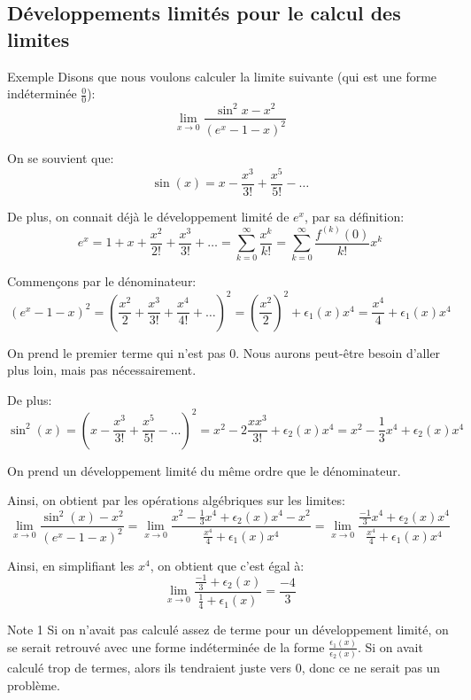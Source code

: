 \documentclass[a4paper]{article}
\begin{document}
\subsection{Développements limités pour le calcul des limites}
\begin{parag}{Exemple}
    Disons que nous voulons calculer la limite suivante (qui est une forme indéterminée $\frac{0}{0}$):
    \[\lim_{x \to 0} \frac{\sin^2 x - x^2}{\left(e^x  - 1 - x\right)^2}\]

    On se souvient que:
    \[\sin\left(x\right) = x - \frac{x^3}{3!} + \frac{x^5}{5!} - \ldots\]

    De plus, on connait déjà le développement limité de $e^x$, par sa définition:
    \[e^x = 1 + x + \frac{x^2}{2!} + \frac{x^3}{3!} + \ldots = \sum_{k=0}^{\infty} \frac{x^k}{k!} = \sum_{k=0}^{\infty} \frac{f^{\left(k\right)}\left(0\right)}{k!} x^k\]

    Commençons par le dénominateur:
    \[\left(e^x - 1 - x\right)^2 = \left(\frac{x^2}{2} + \frac{x^3}{3!} + \frac{x^4}{4!} + \ldots\right)^2 = \left(\frac{x^2}{2}\right)^2 + \epsilon_1\left(x\right) x^4 = \frac{x^4}{4} + \epsilon_1\left(x\right) x^4\]

    On prend le premier terme qui n'est pas 0. Nous aurons peut-être besoin d'aller plus loin, mais pas nécessairement.

    De plus:
    \[\sin^2\left(x\right) = \left(x - \frac{x^3}{3!} + \frac{x^5}{5!} - \ldots\right)^2 = x^2 - 2 \frac{x x^3}{3!} + \epsilon_2\left(x\right) x^4 = x^2 - \frac{1}{3}x^4 + \epsilon_2\left(x\right) x^4\]

    On prend un développement limité du même ordre que le dénominateur.

    Ainsi, on obtient par les opérations algébriques sur les limites:
    \[\lim_{x \to 0} \frac{\sin^2\left(x\right) - x^2}{\left(e^x - 1 - x\right)^2} = \lim_{x \to 0} \frac{x^2 - \frac{1}{3} x^4 + \epsilon_2\left(x\right) x^4 - x^{2}}{\frac{x^4}{4} + \epsilon_1\left(x\right) x^4} = \lim_{x \to 0} \frac{\frac{-1}{3}x^4 + \epsilon_2\left(x\right)x^4}{\frac{x^4}{4} + \epsilon_1\left(x\right)x^4}\]

    Ainsi, en simplifiant les $x^4$, on obtient que c'est égal à:
    \[\lim_{x \to 0} \frac{\frac{-1}{3} + \epsilon_2\left(x\right)}{\frac{1}{4} + \epsilon_1\left(x\right)} = \frac{-4}{3}\]


    \begin{subparag}{Note 1}
        Si on n'avait pas calculé assez de terme pour un développement limité, on se serait retrouvé avec une forme indéterminée de la forme $\frac{\epsilon_1\left(x\right)}{\epsilon_2\left(x\right)}$. Si on avait calculé trop de termes, alors ils tendraient juste vers 0, donc ce ne serait pas un problème.


\end{subparag}
\end{parag}
\end{document}
